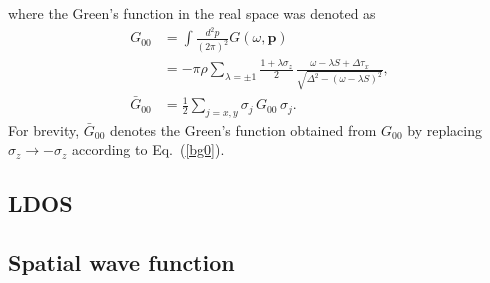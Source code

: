 \documentclass[twocolumn,showpacs,floatfix,nofootinbib,longbibliography]{revtex4-1}
\begin{document}
where the Green's function in the real space was denoted as 
\begin{align}
	G_{00} &   = \int \frac{d^2 p}{(2\pi)^2} G(\omega,\bm p)  	\label{g0} \\
	 & =-\pi\rho\sum_{\lambda = \pm 1} \frac{1+\lambda\sigma_z}{2}\,\frac{\omega-\lambda S+\Delta\tau_x}{\sqrt{\Delta^2-\left( \omega-\lambda S \right)^2}}, \nonumber \\
	 \bar G_{00} & = \frac{1}{2} \sum_{j=x,y}\sigma_j\, G_{00}\, \sigma_j.\label{bg0}
\end{align}
For brevity, $\bar G_{00}$ denotes the Green's function obtained from $G_{00}$ by replacing $\sigma_z \rightarrow - \sigma_z$ according to Eq.~(\ref{bg0}).
\subsection{LDOS} \label{sec:LDOS}
\subsection{Spatial wave function} \label{sec:wf}
\end{document}
